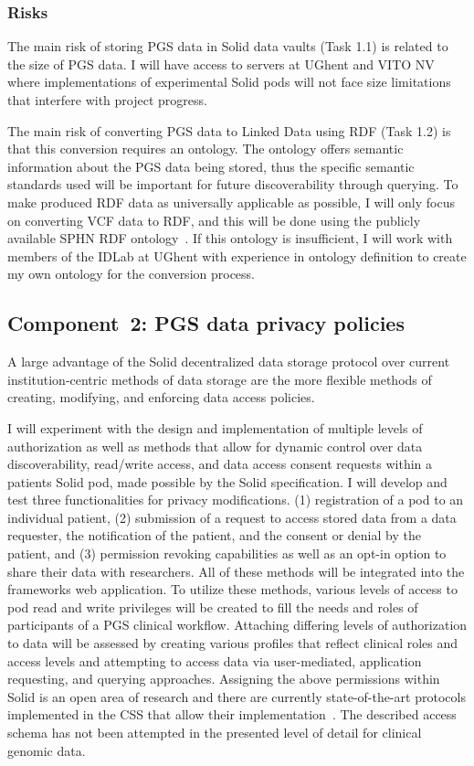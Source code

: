 \documentclass[a4paper,11pt]{article}
\begin{document}
\begin{refsection}
\subsubsection{Risks}
The main risk of storing PGS data in Solid data vaults (Task 1.1) is related to the size of PGS data. 
I will have access to servers at UGhent and VITO NV where implementations of experimental Solid pods will not face size limitations that interfere with project progress.

The main risk of converting PGS data to Linked Data using RDF (Task 1.2) is that this conversion requires an ontology. 
The ontology offers semantic information about the PGS data being stored, thus the specific semantic standards used will be important for future discoverability through querying. 
To make produced RDF data as universally applicable as possible, I will only focus on converting VCF data to RDF, and this will be done using the publicly available SPHN RDF ontology~\cite{sphn_rdf_2023}.
If this ontology is insufficient, I will work with members of the IDLab at UGhent with experience in ontology definition to create my own ontology for the conversion process.


\newcommand\WPb{PGS data privacy policies}
\subsection{Component~2: \WPb}

A large advantage of the Solid decentralized data storage protocol over current institution-centric methods of data storage are the more flexible methods of creating, modifying, and enforcing data access policies. 

I will experiment with the design and implementation of multiple levels of authorization as well as methods that allow for dynamic control over data discoverability, read/write access, and data access consent requests within a patient\textquotesingle s Solid pod, made possible by the Solid specification. 
I will develop and test three functionalities for privacy modifications.
(1) registration of a pod to an individual patient,
(2) submission of a request to access stored data from a data requester, the notification of the patient, and the consent or denial by the patient, and
(3) permission revoking capabilities as well as an opt-in option to share their data with researchers. 
All of these methods will be integrated into the framework\textquotesingle s web application.
To utilize these methods, various levels of access to pod read and write privileges will be created to fill the needs and roles of participants of a PGS clinical workflow. 
Attaching differing levels of authorization to data will be assessed by creating various profiles that reflect clinical roles and access levels and attempting to access data via user-mediated, application requesting, and querying approaches. 
Assigning the above permissions within Solid is an open area of research and there are currently state-of-the-art protocols implemented in the CSS that allow their implementation~\cite{css}.
The described access schema has not been attempted in the presented level of detail for clinical genomic data.



\end{refsection}
\end{document}
